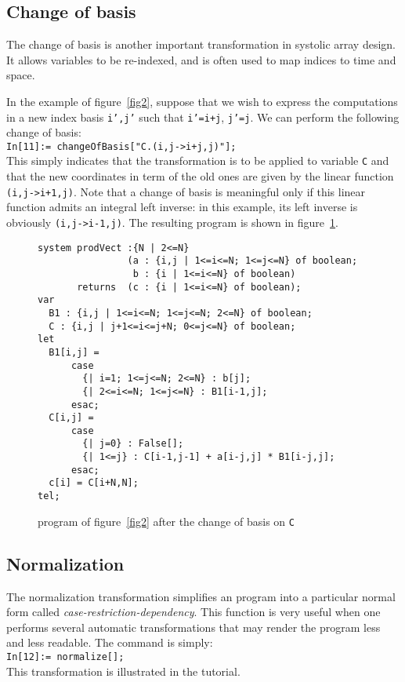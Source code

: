 \subsection{Change of basis}
The change of basis is another important transformation in systolic
array design. It allows 
variables to be re-indexed, and is often used to map indices to time and space. 

In the example of figure~\ref{fig2}, suppose that we wish to express
the computations in a new index basis {\tt i',j'} such that {\tt i'=i+j}, 
{\tt j'=j}. We can perform the following change of basis:
\\ {\tt In[11]:= changeOfBasis["C.(i,j->i+j,j)"]; } \\ This simply
indicates that the transformation is to be applied to variable {\tt C}
and that the new coordinates in term of the old ones are given by
the linear function \texttt{(i,j->i+1,j)}.
Note that a change of basis is meaningful only if
this linear function admits an integral left inverse: in this
example, its left inverse is obviously \texttt{(i,j->i-1,j)}. The
resulting program is shown in figure~\ref{fig3}.

\begin{figure}[ht]
\begin{verbatim}
system prodVect :{N | 2<=N}
                (a : {i,j | 1<=i<=N; 1<=j<=N} of boolean; 
                 b : {i | 1<=i<=N} of boolean)
       returns  (c : {i | 1<=i<=N} of boolean);
var
  B1 : {i,j | 1<=i<=N; 1<=j<=N; 2<=N} of boolean;
  C : {i,j | j+1<=i<=j+N; 0<=j<=N} of boolean;
let
  B1[i,j] = 
      case
        {| i=1; 1<=j<=N; 2<=N} : b[j];
        {| 2<=i<=N; 1<=j<=N} : B1[i-1,j];
      esac;
  C[i,j] = 
      case
        {| j=0} : False[];
        {| 1<=j} : C[i-1,j-1] + a[i-j,j] * B1[i-j,j];
      esac;
  c[i] = C[i+N,N];
tel;
\end{verbatim}
\caption{{\Alpha} program of figure~\ref{fig2} after the change of basis on 
 {\tt C}}
\label{fig3}
\end{figure}

\subsection{Normalization}
\label{normalization}
The normalization transformation simplifies an {\Alpha} program into a
{particular} normal form called {\em case-restriction-dependency}.
This function is very useful when one performs several automatic
transformations that may render the program less and less
readable. The command is simply: \\
{\tt In[12]:= normalize[];}\\This transformation is illustrated in the
\alfa{} tutorial.

